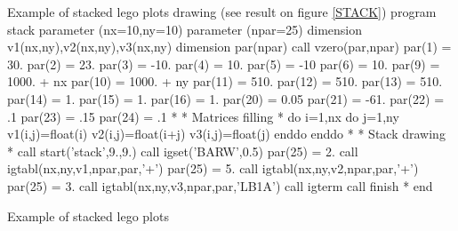 \begin{XMPt}{Example of stacked lego plots drawing (see result on figure 
\ref{STACK})}
      program stack 
      parameter (nx=10,ny=10)
      parameter (npar=25)
      dimension v1(nx,ny),v2(nx,ny),v3(nx,ny)
      dimension par(npar)
      call vzero(par,npar)
      par(1)  = 30.
      par(2)  = 23.
      par(3)  = -10.
      par(4)  = 10.
      par(5)  = -10
      par(6)  = 10.
      par(9)  = 1000. + nx
      par(10) = 1000. + ny
      par(11) = 510.
      par(12) = 510.
      par(13) = 510.
      par(14) = 1.
      par(15) = 1.
      par(16) = 1.
      par(20) = 0.05
      par(21) = -61.
      par(22) = .1
      par(23) = .15
      par(24) = .1
*
*              Matrices filling
*
      do i=1,nx
         do j=1,ny
            v1(i,j)=float(i)
            v2(i,j)=float(i+j)
            v3(i,j)=float(j)
         enddo
      enddo
*
*              Stack drawing
*
      call start('stack',9.,9.)
      call igset('BARW',0.5)
      par(25) = 2.
      call igtabl(nx,ny,v1,npar,par,'+')
      par(25) = 5.
      call igtabl(nx,ny,v2,npar,par,'+')
      par(25) = 3.
      call igtabl(nx,ny,v3,npar,par,'LB1A')
      call igterm
      call finish
*
      end
\end{XMPt}

\begin{Fighere}
\begin{center}\mbox{}\end{center}
\caption{Example of stacked lego plots}
\label{STACK}
\end{Fighere}
\clearpage

